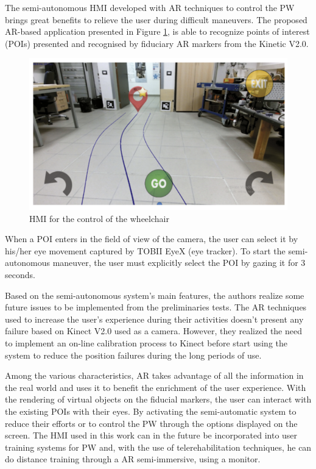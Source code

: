The semi-autonomous HMI developed with AR techniques to control the PW  brings great benefits to relieve the user during difficult maneuvers.  The proposed AR-based application presented in Figure \ref{fig:maule2017}, is able to recognize points of interest (POIs) presented and recognised by fiduciary AR markers from the Kinetic V2.0. 

\begin{figure}[!hbt]
\begin{center}
\includegraphics[width=0.94 \textwidth]{img/cap3/maule2017-AR}
\caption{HMI for the control of the wheelchair \cite{maule2017}}
\label{fig:maule2017}
\end{center}
\end{figure}

When a POI enters in the field of view of the camera, the user can select it by his/her eye movement captured by TOBII EyeX (eye tracker). To start the semi-autonomous maneuver, the user must explicitly select the POI by gazing it for 3 seconds. 

Based on the semi-autonomous system's main features, the authors realize some future issues to be implemented from the preliminaries tests. The AR techniques used to increase the user's experience during their activities doesn't present any failure based on Kinect V2.0 used as a camera. However,  they realized the need to implement an on-line calibration process to Kinect before start using the  system to reduce the position failures during the long periods of use. 

Among the various characteristics, AR takes advantage of all the information in the real world and uses it to benefit the enrichment of the user experience. With the rendering of virtual objects on the fiducial markers, the user can interact with the existing POIs with their eyes.  By activating the semi-automatic system to reduce their efforts or to control the PW through the options displayed on the screen. The HMI used in this work can in the future be incorporated into user training systems for PW and, with the use of telerehabilitation techniques, he can do distance training through a AR semi-immersive, using a monitor.

